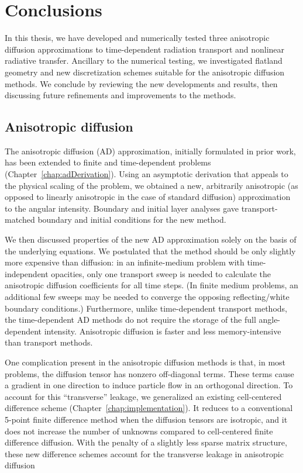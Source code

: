 
\chapter{Conclusions}\label{chap:conclusion}

In this thesis, we have developed and numerically tested three anisotropic
diffusion approximations to time-dependent radiation transport and
nonlinear radiative transfer. Ancillary to the numerical testing, we
investigated flatland geometry and new discretization schemes suitable for the
anisotropic diffusion methods. We conclude by reviewing the new developments and
results, then discussing future refinements and improvements to the methods.

\section{Anisotropic diffusion}

The anisotropic diffusion (AD) approximation, initially formulated in prior work, has been extended to finite and time-dependent problems
(Chapter~\ref{chap:adDerivation}). Using an asymptotic
derivation that appeals to the physical scaling of the problem, we
obtained a new, arbitrarily anisotropic (as opposed to linearly anisotropic in
the case of standard diffusion) approximation to the angular intensity.
Boundary and initial layer analyses gave transport-matched boundary and initial
conditions for the new method.

We then discussed properties of the new AD approximation solely on the basis of
the underlying equations. We postulated that the method should be only slightly
more expensive than diffusion: in an infinite-medium problem with
time-independent opacities, only one transport sweep is needed to calculate
the anisotropic diffusion coefficients for all time steps. (In finite medium
problems, an additional few sweeps may be needed to converge the opposing
reflecting/white boundary conditions.) Furthermore, unlike time-dependent
transport methods, the time-dependent AD methods do not require the storage of
the full angle-dependent intensity. Anisotropic diffusion is faster and less
memory-intensive than transport methods.

One complication present in the anisotropic diffusion methods is
that, in most problems, the diffusion tensor has nonzero off-diagonal terms.
These terms cause a gradient in one direction to induce particle flow in an
orthogonal direction. To account for this ``transverse'' leakage, we generalized
an existing cell-centered difference scheme (Chapter~\ref{chap:implementation}).
It reduces to a conventional 5-point finite difference method when the diffusion
tensors are isotropic, and it does not increase the number of unknowns compared
to cell-centered finite difference diffusion. With the penalty of a slightly
less sparse matrix structure, these new difference schemes account for the
transverse leakage in anisotropic diffusion

